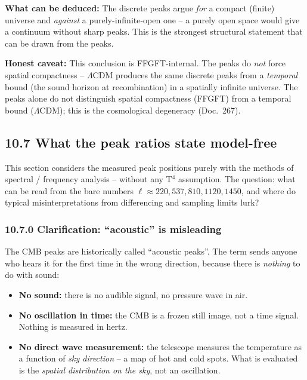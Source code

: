 \textbf{What can be deduced:} The discrete peaks argue \emph{for}
a compact (finite) universe and \emph{against} a purely-infinite-open
one -- a purely open space would give a continuum without sharp
peaks. This is the strongest structural statement that can be drawn
from the peaks.

\textbf{Honest caveat:} This conclusion is FFGFT-internal. The peaks
do \emph{not} force spatial compactness -- $\Lambda$CDM produces the
same discrete peaks from a \emph{temporal} bound (the sound horizon
at recombination) in a spatially infinite universe. The peaks alone
do not distinguish spatial compactness (FFGFT) from a temporal bound
($\Lambda$CDM); this is the cosmological degeneracy (Doc.~267).

\subsection*{10.7 What the peak ratios state model-free}

This section considers the measured peak positions purely with the
methods of spectral / frequency analysis -- without any T$^4$
assumption. The question: what can be read from the bare numbers
$\ell \approx 220, 537, 810, 1120, 1450$, and where do typical
misinterpretations from differencing and sampling limits lurk?

\subsubsection*{10.7.0 Clarification: ``acoustic'' is misleading}

The CMB peaks are historically called ``acoustic peaks''. The term
sends anyone who hears it for the first time in the wrong direction,
because there is \emph{nothing} to do with sound:

\begin{itemize}
  \item \textbf{No sound:} there is no audible signal, no pressure
        wave in air.
  \item \textbf{No oscillation in time:} the CMB is a frozen still
        image, not a time signal. Nothing is measured in hertz.
  \item \textbf{No direct wave measurement:} the telescope measures
        the temperature as a function of \emph{sky direction} -- a map
        of hot and cold spots. What is evaluated is the \emph{spatial
        distribution on the sky}, not an oscillation.
\end{itemize}

